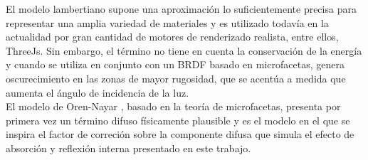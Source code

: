             El modelo lambertiano supone una aproximaci\'on lo suficientemente precisa para representar una amplia variedad de
            materiales y es utilizado todav\'ia en la actualidad por gran cantidad de motores de renderizado realista, entre ellos,
            ThreeJs. Sin embargo, el t\'ermino no tiene en cuenta la conservaci\'on de la energ\'ia y
            cuando se utiliza en conjunto con un BRDF basado en microfacetas, genera oscurecimiento en las zonas de mayor rugosidad,
            que se acent\'ua a medida que aumenta el \'angulo de incidencia de la luz.\\
            
            El modelo de Oren-Nayar \autocite{orennayar}, basado en la teor\'ia de microfacetas, presenta por primera vez un t\'ermino
            difuso f\'isicamente plausible y es el modelo en el que se inspira el factor de correci\'on sobre la componente difusa que
            simula el efecto de absorci\'on y reflexi\'on interna presentado en este trabajo.\\



